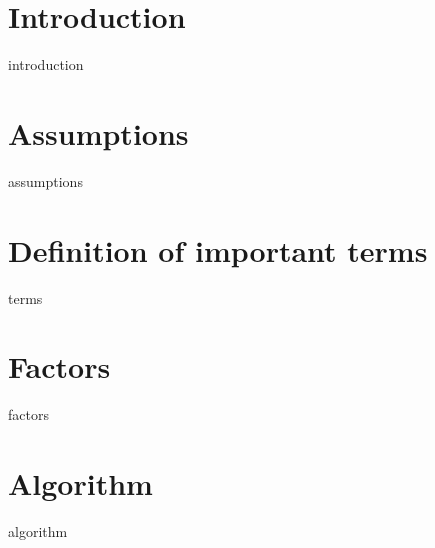 
\section{Introduction}
{introduction}

\section{Assumptions}
{assumptions}

\section{Definition of important terms}
\begin{labeling}{\hspace{3cm}}
{terms}
\end{labeling}

\section{Factors}
{factors}

\section{Algorithm}
{algorithm}
